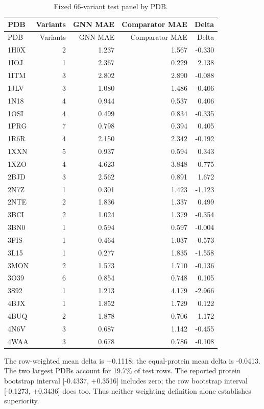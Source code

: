 \begin{longtable}{lrrrr}
\caption{Fixed 66-variant test panel by PDB.}\label{tab:grp}\\
\hline PDB & Variants & GNN MAE & Comparator MAE & Delta\\\hline\endfirsthead
\hline PDB & Variants & GNN MAE & Comparator MAE & Delta\\\hline\endhead
1H0X & 2 & 1.237 & 1.567 & -0.330\\
1IOJ & 1 & 2.367 & 0.229 & 2.138\\
1ITM & 3 & 2.802 & 2.890 & -0.088\\
1JLV & 3 & 1.080 & 1.486 & -0.406\\
1N18 & 4 & 0.944 & 0.537 & 0.406\\
1OSI & 4 & 0.499 & 0.834 & -0.335\\
1PRG & 7 & 0.798 & 0.394 & 0.405\\
1R6R & 4 & 2.150 & 2.342 & -0.192\\
1XXN & 5 & 0.937 & 0.594 & 0.343\\
1XZO & 4 & 4.623 & 3.848 & 0.775\\
2BJD & 3 & 2.562 & 0.891 & 1.672\\
2N7Z & 1 & 0.301 & 1.423 & -1.123\\
2NTE & 2 & 1.836 & 1.337 & 0.499\\
3BCI & 2 & 1.024 & 1.379 & -0.354\\
3BN0 & 1 & 0.594 & 0.597 & -0.004\\
3FIS & 1 & 0.464 & 1.037 & -0.573\\
3L15 & 1 & 0.277 & 1.835 & -1.558\\
3MON & 2 & 1.573 & 1.710 & -0.136\\
3O39 & 6 & 0.854 & 0.748 & 0.105\\
3S92 & 1 & 1.213 & 4.179 & -2.966\\
4BJX & 1 & 1.852 & 1.729 & 0.122\\
4BUQ & 2 & 1.878 & 0.706 & 1.172\\
4N6V & 3 & 0.687 & 1.142 & -0.455\\
4WAA & 3 & 0.678 & 0.786 & -0.108\\
\hline\end{longtable}
The row-weighted mean delta is +0.1118; the equal-protein mean delta is -0.0413. The two largest PDBs account for 19.7\% of test rows. The reported protein bootstrap interval [-0.4337, +0.3516] includes zero; the row bootstrap interval [-0.1273, +0.3436] does too. Thus neither weighting definition alone establishes superiority.
